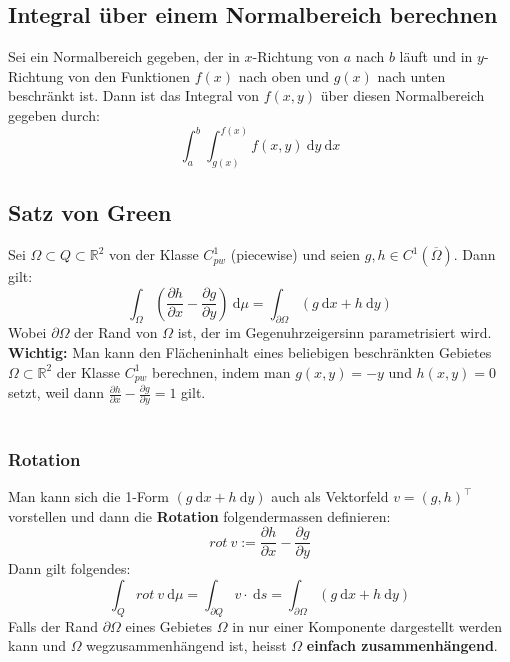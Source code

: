 \documentclass[a4paper,10pt]{scrartcl}
\newcommand{\diff}{\ \mathrm{d}}
\begin{document}
\subsection{Integral über einem Normalbereich berechnen}
Sei ein Normalbereich gegeben, der in $x$-Richtung von $a$ nach $b$ läuft und in $y$-Richtung von den Funktionen $f(x)$ nach oben und $g(x)$ nach unten beschränkt ist. Dann ist das Integral von $f(x,y)$ über diesen Normalbereich gegeben durch: 
\begin{equation}
	\int_{a}^{b} \int_{g(x)}^{f(x)} f(x,y) \diff y \diff x
\end{equation}
\subsection{Satz von Green}
Sei $\Omega\subset Q \subset \mathbb{R}^2$ von der Klasse $C^1_{pw}$ (piecewise) und seien $g,h\in C^1(\overline{\Omega})$. Dann gilt: 
\begin{equation}
	\int_{\Omega}\left( \frac{\partial h}{\partial x} - \frac{\partial g}{\partial y}\right) \diff \mu = 
	\int_{\partial \Omega} (g\diff x+h\diff y)
\end{equation}
Wobei $\partial \Omega$ der Rand von $\Omega$ ist, der im Gegenuhrzeigersinn parametrisiert wird. \\
\textbf{Wichtig:} Man kann den Flächeninhalt eines beliebigen beschränkten Gebietes $\Omega\subset \mathbb{R}^2$ der Klasse $C^1_{pw}$ berechnen, indem man $g(x,y)=-y$ und $h(x,y)=0$ setzt, weil dann $\frac{\partial h}{\partial x} - \frac{\partial g}{\partial y} =1$ gilt.\\\\
\subsubsection{Rotation} \label{rotation}
Man kann sich die 1-Form $(g\diff x+h\diff y)$ auch als Vektorfeld $v=(g,h)^\top$ vorstellen und dann die \textbf{Rotation} folgendermassen definieren: \begin{equation}
rot\ v := \frac{\partial h}{\partial x} - \frac{\partial g}{\partial y}
\end{equation}
Dann gilt folgendes: 
\begin{equation}
	\int_Q rot \ v \diff \mu = \int_{\partial Q} v\cdot \diff s = \int_{\partial \Omega} (g\diff x+h\diff y)
\end{equation}
Falls der Rand $\partial \Omega$ eines Gebietes $\Omega$ in nur einer Komponente dargestellt werden kann und $\Omega$ wegzusammenhängend ist, heisst $\Omega$ \textbf{einfach zusammenhängend}.\\
\end{document}
